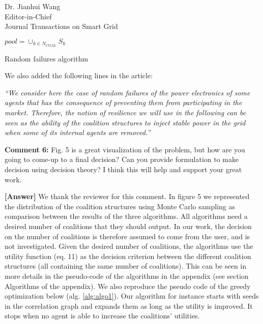 \documentclass{letter}
\begin{document}
\begin{letter}{Dr. Jianhui Wang \\ Editor-in-Chief \\ Journal Transactions on Smart Grid }
\begin{algorithm}
	
	$ pool = \cup_{k \in N_{COAL}} S_k $ \; 
	\caption{Random failures algorithm}
\label{alg:algo4}
\end{algorithm}

 We also added the following lines in the article: 

\textit{“We consider here the case of random failures of the power electronics of some agents that has the consequence of preventing them from participating in the market. Therefore, the notion of resilience we will use in the following can be seen as the ability of the coalition structures to inject stable power in the grid when some of its internal agents are removed.”}


\textbf{Comment 6:} Fig. 5 is a great visualization of the problem, but how are you going to come-up to a final decision? Can you provide formulation to make decision using decision theory? I think this will help and support your great work.


\textbf{[Answer]} We thank the reviewer for this comment. In figure 5 we represented the distribution of the coalition structures using Monte Carlo sampling as comparison between the results of the three algorithms. All algorithms need a desired number of coalitions that they should output. In our work, the decision on the number of coalitions is therefore assumed to come from the user, and is not investigated. Given the desired number of coalitions, the algorithms use the utility function (eq. 11) as the decision criterion between the different coalition structures (all containing the same number of coalitions). This can be seen in more details in the pseudo-code of the algorithms in the appendix (see section Algorithms of the appendix). We also reproduce the pseudo code of the greedy optimization below (alg. \ref{alg:algo1}). Our algorithm for instance starts with seeds in the correlation graph and expands them as long as the utility is improved. It stops when no agent is able to increase the coalitions’ utilities.



\end{letter}
\end{document}
